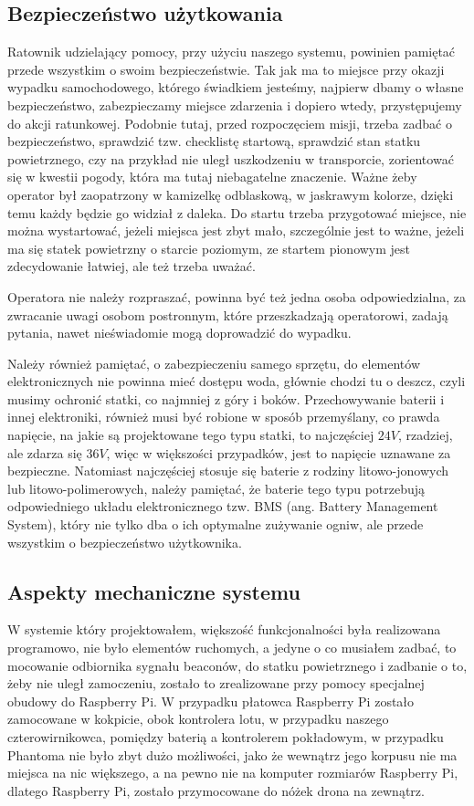 \subsection{Bezpieczeństwo użytkowania}

Ratownik udzielający pomocy, przy użyciu naszego systemu, powinien pamiętać przede wszystkim o swoim bezpieczeństwie. Tak jak ma to miejsce przy okazji wypadku samochodowego, którego świadkiem jesteśmy, najpierw dbamy o własne bezpieczeństwo, zabezpieczamy miejsce zdarzenia i dopiero wtedy, przystępujemy do akcji ratunkowej. Podobnie tutaj, przed rozpoczęciem misji, trzeba zadbać o bezpieczeństwo, sprawdzić tzw. checklistę startową, sprawdzić stan statku powietrznego, czy na przykład nie uległ uszkodzeniu w transporcie, zorientować się w kwestii pogody, która ma tutaj niebagatelne znaczenie. Ważne żeby operator był zaopatrzony w kamizelkę odblaskową, w jaskrawym kolorze, dzięki temu każdy będzie go widział z daleka. Do startu trzeba przygotować miejsce, nie można wystartować, jeżeli miejsca jest zbyt mało, szczególnie jest to ważne, jeżeli ma się statek powietrzny o starcie poziomym, ze startem pionowym jest zdecydowanie łatwiej, ale też trzeba uważać.

Operatora nie należy rozpraszać, powinna być też jedna osoba odpowiedzialna, za zwracanie uwagi osobom postronnym, które przeszkadzają operatorowi, zadają pytania, nawet nieświadomie mogą doprowadzić do wypadku.

Należy również pamiętać, o zabezpieczeniu samego sprzętu, do elementów elektronicznych nie powinna mieć dostępu woda, głównie chodzi tu o deszcz, czyli musimy ochronić statki, co najmniej z góry i boków. Przechowywanie baterii i innej elektroniki, również musi być robione w sposób przemyślany, co prawda napięcie, na jakie są projektowane tego typu statki, to najczęściej $24 V$, rzadziej, ale zdarza się $36 V$, więc w większości przypadków, jest to napięcie uznawane za bezpieczne. Natomiast najczęściej stosuje się baterie z rodziny litowo-jonowych lub litowo-polimerowych, należy pamiętać, że baterie tego typu potrzebują odpowiedniego układu elektronicznego tzw. BMS (ang. Battery Management System), który nie tylko dba o ich optymalne zużywanie ogniw,  ale przede wszystkim o bezpieczeństwo użytkownika.

\subsection{Aspekty mechaniczne systemu}

W systemie który projektowałem, większość funkcjonalności była realizowana programowo, nie było elementów ruchomych, a jedyne o co musiałem zadbać, to mocowanie odbiornika sygnału beaconów, do statku powietrznego i zadbanie o to, żeby nie uległ zamoczeniu, zostało to zrealizowane przy pomocy specjalnej obudowy do Raspberry Pi. W przypadku płatowca Raspberry Pi zostało zamocowane w kokpicie, obok kontrolera lotu, w przypadku naszego czterowirnikowca, pomiędzy baterią a kontrolerem pokładowym, w przypadku Phantoma nie było zbyt dużo możliwości, jako że wewnątrz jego korpusu nie ma miejsca na nic większego, a na pewno nie na komputer rozmiarów Raspberry Pi, dlatego Raspberry Pi, zostało przymocowane do nóżek drona na zewnątrz.

